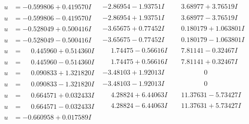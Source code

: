\documentclass[1p]{elsarticle_modified}
\theoremstyle{definition}
\begin{document}
$$\begin{array}{c|c|c}
 \hline 
\begin{aligned}
u &= -0.599806 + 0.419570 I\end{aligned}
 & -2.86954 - 1.93751 I & \phantom{-}3.68977 + 3.76519 I \\ \hline\begin{aligned}
u &= -0.599806 - 0.419570 I\end{aligned}
 & -2.86954 + 1.93751 I & \phantom{-}3.68977 - 3.76519 I \\ \hline\begin{aligned}
u &= -0.528049 + 0.500416 I\end{aligned}
 & -3.65675 + 0.77452 I & \phantom{-}0.180179 + 1.063801 I \\ \hline\begin{aligned}
u &= -0.528049 - 0.500416 I\end{aligned}
 & -3.65675 - 0.77452 I & \phantom{-}0.180179 - 1.063801 I \\ \hline\begin{aligned}
u &= \phantom{-}0.445960 + 0.514360 I\end{aligned}
 & \phantom{-}1.74475 - 0.56616 I & \phantom{-}7.81141 - 0.32467 I \\ \hline\begin{aligned}
u &= \phantom{-}0.445960 - 0.514360 I\end{aligned}
 & \phantom{-}1.74475 + 0.56616 I & \phantom{-}7.81141 + 0.32467 I \\ \hline\begin{aligned}
u &= \phantom{-}0.090833 + 1.321820 I\end{aligned}
 & -3.48103 + 1.92013 I & \phantom{-0.000000 } 0 \\ \hline\begin{aligned}
u &= \phantom{-}0.090833 - 1.321820 I\end{aligned}
 & -3.48103 - 1.92013 I & \phantom{-0.000000 } 0 \\ \hline\begin{aligned}
u &= \phantom{-}0.664571 + 0.032433 I\end{aligned}
 & \phantom{-}4.28824 + 6.44063 I & \phantom{-}11.37631 - 5.73427 I \\ \hline\begin{aligned}
u &= \phantom{-}0.664571 - 0.032433 I\end{aligned}
 & \phantom{-}4.28824 - 6.44063 I & \phantom{-}11.37631 + 5.73427 I \\ \hline\begin{aligned}
u &= -0.660958 + 0.017589 I\end{aligned}

\end{array}$$
\end{document}
